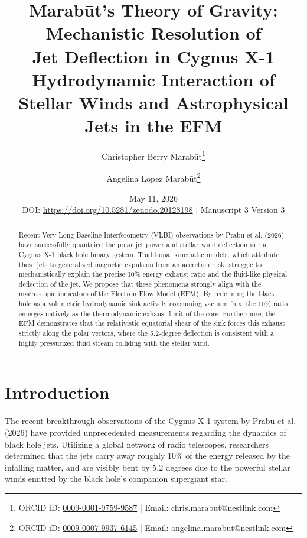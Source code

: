 \documentclass[11pt, a4paper]{article}
\title{\textbf{Marab\={u}t's Theory of Gravity: \\ Mechanistic Resolution of \\ Jet Deflection in Cygnus X-1} \\[1em] \large{Hydrodynamic Interaction of Stellar Winds and Astrophysical Jets in the EFM}}
\author[1]{Christopher Berry Marab\={u}t\thanks{ORCID iD: \href{https://orcid.org/0009-0001-9759-9587}{0009-0001-9759-9587} | Email: chris.marabut@nestlink.com}}
\author[1]{Angelina Lopez Marab\={u}t\thanks{ORCID iD: \href{https://orcid.org/0009-0007-9937-6145}{0009-0007-9937-6145} | Email: angelina.marabut@nestlink.com}}
\affil[1]{Independent Researchers}
\date{May 11, 2026 \\[1.5em] \small{DOI: \url{https://doi.org/10.5281/zenodo.20128198} $|$ Manuscript 3 Version 3}}
\begin{document}

\maketitle

\begin{abstract}
  Recent Very Long Baseline Interferometry (VLBI) observations by Prabu et al. (2026) have successfully quantified the polar jet power and stellar wind deflection in the Cygnus X-1 black hole binary system. Traditional kinematic models, which attribute these jets to generalized magnetic expulsion from an accretion disk, struggle to mechanistically explain the precise 10\% energy exhaust ratio and the fluid-like physical deflection of the jet. We propose that these phenomena strongly align with the macroscopic indicators of the Electron Flow Model (EFM). By redefining the black hole as a volumetric hydrodynamic sink actively consuming vacuum flux, the 10\% ratio emerges natively as the thermodynamic exhaust limit of the core. Furthermore, the EFM demonstrates that the relativistic equatorial shear of the sink forces this exhaust strictly along the polar vectors, where the 5.2-degree deflection is consistent with a highly pressurized fluid stream colliding with the stellar wind.
\end{abstract}

\section{Introduction}
The recent breakthrough observations of the Cygnus X-1 system by Prabu et al. (2026) \cite{prabu2026} have provided unprecedented measurements regarding the dynamics of black hole jets. Utilizing a global network of radio telescopes, researchers determined that the jets carry away roughly 10\% of the energy released by the infalling matter, and are visibly bent by 5.2 degrees due to the powerful stellar winds emitted by the black hole's companion supergiant star.
\end{document}
